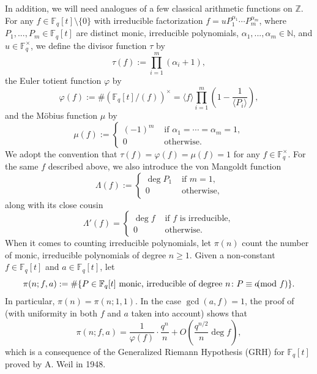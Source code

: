 \documentclass{article}
\theoremstyle{definition}
\theoremstyle{definition}
\theoremstyle{remark}
\newcommand{\Z}{\mathbb{Z}}
\newcommand{\N}{\mathbb{N}}
\newcommand{\F}{\mathbb{F}_q[t]}
\renewcommand\phi\varphi
\newcommand{\1}{\mathbf{1}}
\numberwithin{equation}{section}
\begin{document}
In addition, we will need analogues of a few classical arithmetic functions on $\Z$. For any $f\in \F\setminus\{0\}$ with irreducible factorization $f=uP_1^{\alpha_1}\cdots P_m^{\alpha_m}$, where $P_1,...,P_m\in\F$ are distinct monic, irreducible polynomials, $\alpha_1,...,\alpha_m\in\N$, and $u\in\mathbb{F}_q^{\times}$, we define the divisor function $\tau$ by 
\[\tau(f):=\prod_{i=1}^m (\alpha_i+1),\]
the Euler totient function $\phi$ by
\[\phi(f):=\#(\F/(f))^{\times}=\langle f \rangle\prod_{i=1}^{m}\left(1-\frac{1}{\langle P_i \rangle}\right),\]
and the M\"{o}bius function $\mu$ by
\[\mu(f):=
\begin{cases}
(-1)^m & \text{ if $\alpha_1=\cdots=\alpha_m=1$},\\
0 & \text{ otherwise}.
\end{cases}
\]
We adopt the convention that $\tau(f)=\phi(f)=\mu(f)=1$ for any $f\in\mathbb{F}_q^{\times}$. For the same $f$ described above, we also introduce the von Mangoldt function 
\[\Lambda(f):=
\begin{cases}
\deg P_1&\text{ if $m=1$},\\
0&\text{ otherwise},
\end{cases}\]
along with its close cousin
\[\Lambda'(f)=
\begin{cases}
\deg f&\text{ if } f\text{ is irreducible},\\
0&\text{ otherwise}.
\end{cases}\]
When it comes to counting irreducible polynomials, let $\pi(n)$ count the number of monic, irreducible polynomials of degree $n\ge1$. Given a non-constant $f\in\F$ and $a\in\F$, let 
\[\pi(n;f,a):=\#\{P\in\F\text{~monic, irreducible of degree~}n\colon P\equiv a\hspace*{-2.5mm}\pmod{f}\}.\]
In particular, $\pi(n)=\pi(n;1,1)$. In the case $\gcd(a,f)=1$, the proof of \cite[Theorem 4.8]{Rosen02} (with uniformity in both $f$ and $a$ taken into account) shows that 
\begin{equation}\label{eq:PNT}
\pi(n;f,a)=\frac{1}{\phi(f)}\cdot\frac{q^n}{n}+O\left(\frac{q^{n/2}}{n}\deg f\right),
\end{equation}
which is a consequence of the Generalized Riemann Hypothesis (GRH) for $\F$ proved by A. Weil in 1948.
\end{document}
